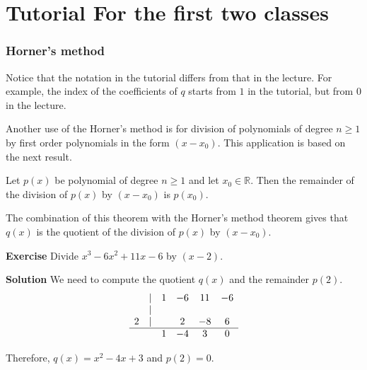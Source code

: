 \documentclass[main.tex]{subfiles}
\begin{document}
\pagestyle{plain}
\setcounter{chapter}{2}

\chapter{Tutorial For the first two classes}
\label{chap:chapter3}
\subsection{Horner's method}
\par Notice that the notation in the tutorial differs from that in the lecture. For example, the index of the coefficients of $q$ starts from $1$ in the tutorial, but from $0$ in the lecture. 

\par Another use of the Horner's method is for division of polynomials of degree $n\ge 1$ by first order polynomials in the form $(x - x_0)$. This application is based on the next result. 

\begin{theorem}
    Let $p(x)$ be polynomial of degree $n \ge 1$ and let $x_0\in \mathbb{R}$. Then the remainder of the division of $p(x)$ by $(x - x_0)$ is $p(x_0)$.  
\end{theorem}
\par The combination of this theorem with the Horner's method theorem gives that $q(x)$ is the quotient of the division of $p(x)$ by $(x - x_0)$. 

\par \noindent \textbf{Exercise} Divide $x^3 - 6x^2 + 11x - 6$ by $(x - 2)$.

\par \noindent \textbf{Solution} We need to compute the quotient $q(x)$ and the remainder $p(2)$. 
$$
\begin{array}{cccccc}
    \null & | & 1 & -6 & 11 & -6 \\
    \null & | & \null &     &     &     \\
    2 & | &   & 2 & -8 & 6 \\
    \hline
    \null &   & 1 & -4 & 3 & 0 \\   
\end{array}
$$
\par Therefore, $q(x) = x^2 - 4x + 3$ and $p(2) = 0$. 
\end{document}
